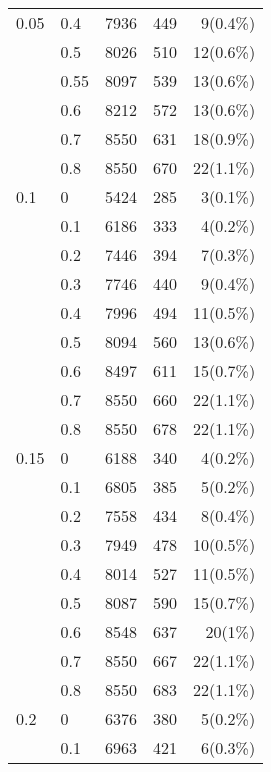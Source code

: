 \begin{center}
\begin{longtable}{llrrr}
0.05 & 0.4   & 7936 & 449 & 9(0.4\%)  \\
                      & 0.5   & 8026 & 510 & 12(0.6\%) \\
                      & 0.55  & 8097 & 539 & 13(0.6\%) \\
                      & 0.6   & 8212 & 572 & 13(0.6\%) \\
                      & 0.7   & 8550 & 631 & 18(0.9\%) \\
                      & 0.8   & 8550 & 670 & 22(1.1\%) \\ \hline
 0.1                       & 0     & 5424 & 285 & 3(0.1\%)  \\
                      & 0.1   & 6186 & 333 & 4(0.2\%)  \\
                      & 0.2   & 7446 & 394 & 7(0.3\%)  \\
                      & 0.3   & 7746 & 440 & 9(0.4\%)  \\
                      & 0.4   & 7996 & 494 & 11(0.5\%) \\
                      & 0.5   & 8094 & 560 & 13(0.6\%) \\
                      & 0.6   & 8497 & 611 & 15(0.7\%) \\
                      & 0.7   & 8550 & 660 & 22(1.1\%) \\
                      & 0.8   & 8550 & 678 & 22(1.1\%) \\ \hline
                       0.15 & 0     & 6188 & 340 & 4(0.2\%)  \\
                      & 0.1   & 6805 & 385 & 5(0.2\%)  \\
                      & 0.2   & 7558 & 434 & 8(0.4\%)  \\
                      & 0.3   & 7949 & 478 & 10(0.5\%) \\
                      & 0.4   & 8014 & 527 & 11(0.5\%) \\
                      & 0.5   & 8087 & 590 & 15(0.7\%) \\
                      & 0.6   & 8548 & 637 & 20(1\%)   \\
                      & 0.7   & 8550 & 667 & 22(1.1\%) \\
                      & 0.8   & 8550 & 683 & 22(1.1\%) \\ \hline
                        0.2 & 0     & 6376 & 380 & 5(0.2\%)  \\
                      & 0.1   & 6963 & 421 & 6(0.3\%)  \\

\end{longtable}
\end{center}
